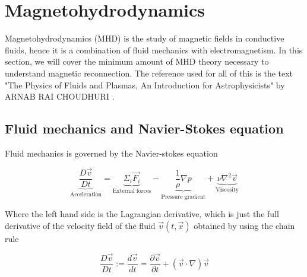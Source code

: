 \section{Magnetohydrodynamics}\label{sec:Magnetohydrodynamics}

Magnetohydrodynamics (MHD) is the study of magnetic fields in conductive fluids, hence it is a combination of fluid mechanics with electromagnetism. In this section, we will cover the minimum amount of MHD theory necessary to understand magnetic reconnection. The reference used for all of this is the text "The Physics of Fluids and Plasmas, An Introduction for Astrophysicists" by ARNAB RAI CHOUDHURI \cite{choudhuri_1998}.

\subsection{Fluid mechanics and Navier-Stokes equation}
Fluid mechanics is governed by the Navier-stokes equation

\begin{equation}\label{eq:Navier-Stokes}
    \underbrace{\frac{D \Vec{v}}{Dt}}_{\text{Acceleration}} = 
    \underbrace{\Sigma_{i}\Vec{F_i}}_{\text{External forces}} - 
    \underbrace{\frac{1}{\rho} \nabla p}_{\text{Pressure gradient}} + 
    \underbrace{\nu \nabla^2 \Vec{v}}_{\text{Viscosity}}
\end{equation}

Where the left hand side is the Lagrangian derivative, which is just the full derivative of the velocity field of the fluid 
$\Vec{v}(t,\Vec{x})$ obtained by using the chain rule


\begin{equation}
    \frac{D\Vec{v}}{Dt} := \frac{d\Vec{v}}{dt} = \frac{\partial \Vec{v}}{\partial t} + (\Vec{v}\cdot\nabla)\Vec{v}
\end{equation}

